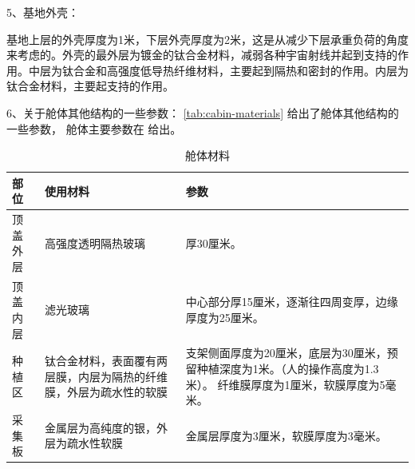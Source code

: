 5、基地外壳：

基地上层的外壳厚度为1米，下层外壳厚度为2米，这是从减少下层承重负荷的角度来考虑的。外壳的最外层为镀金的钛合金材料，减弱各种宇宙射线并起到支持的作用。中层为钛合金和高强度低导热纤维材料，主要起到隔热和密封的作用。内层为钛合金材料，主要起支持的作用。

6、关于舱体其他结构的一些参数：
\cref{tab:cabin-materials} 给出了舱体其他结构的一些参数，
舱体主要参数在  给出。
\begin{table}[H]
  \centering
  \caption{舱体材料}
  \label{tab:cabin-materials}
  \label{chp:cabin:end}
  \begin{tabular}{|>{\centering}m{}|m{}|m{}|}
    \hline
    部位 & 使用材料 & 参数 \tabularnewline
    \hline
    顶盖外层 & 高强度透明隔热玻璃 & 厚30厘米。\tabularnewline
    \hline
    顶盖内层 & 滤光玻璃 & 中心部分厚15厘米，逐渐往四周变厚，边缘厚度为25厘米。\tabularnewline
    \hline
    种植区 & 钛合金材料，表面覆有两层膜，内层为隔热的纤维膜，外层为疏水性的软膜
           & 支架侧面厚度为20厘米，底层为30厘米，预留种植深度为1米。（人的操作高度为1.3米）。
    纤维膜厚度为1厘米，软膜厚度为5毫米。\tabularnewline
    \hline
    采集板 & 金属层为高纯度的银，外层为疏水性软膜 & 金属层厚度为3厘米，软膜厚度为3毫米。\tabularnewline
    \hline
  \end{tabular}
\end{table}
